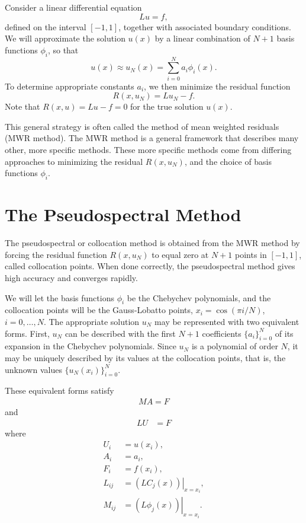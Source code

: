\label{lab:pseudospectral1_revision}

Consider a linear differential equation 
\[Lu = f, \]
defined on the interval $[-1,1]$, together with associated boundary conditions. 
We will approximate the solution $u(x)$ by a linear combination of $N+1$ basis functions $\phi_i$, so that 
\[
u(x) \approx u_N(x) = \sum_{i=0}^N a_i \phi_i(x). 
\]
To determine appropriate constants $a_i$, we then minimize the residual function 
\[
R(x,u_N) = Lu_N - f.
\]
Note that $R(x,u) = Lu - f = 0$ for the true solution $u(x)$.

This general strategy is often called the method of mean weighted residuals (MWR method). The MWR method is a general framework that describes many other, more specific methods. These more specific methods come from differing approaches to minimizing the residual $R(x,u_N)$, and the choice of basis functions $\phi_i$.


\section*{The Pseudospectral Method}
The pseudospectral or collocation method is obtained from the MWR method by forcing the residual function $R(x,u_N)$ to equal zero at $N+1$ points in $[-1,1]$, called collocation points. 
When done correctly, the pseudospectral method gives high accuracy and converges rapidly. 

We will let the basis functions $\phi_i$ be the Chebychev polynomials, and the collocation points will be the Gauss-Lobatto points, $x_i = \cos(\pi i /N)$, $ i = 0, \ldots, N$.
The appropriate solution $u_N$ may be represented with two equivalent forms. 
First, $u_N$ can be described with the first $N+1$ coefficients  $\{a_i\}_{i=0}^N$ of its expansion in the Chebychev polynomials. 
Since $u_N$ is a polynomial of order $N$, it may be uniquely described by its values at the collocation points, that is, the unknown values  $\{u_N(x_i)\}_{i=0}^N$.

These equivalent forms satisfy
\begin{align}
	MA = F \label{spectral1b:chebychev_expansion}
\end{align}
and
\begin{align}
	LU &= F \label{spectral1b:grid_point}
\end{align}
where 
\begin{align*}
	U_i &= u(x_i),\\
	A_i &= a_i,\\
	F_i &= f(x_i),\\
	L_{ij} &= \left.(LC_j(x))\right|_{x=x_i},\\
	M_{ij} &= \left.(L\phi_j(x))\right|_{x=x_i}. 
\end{align*}

